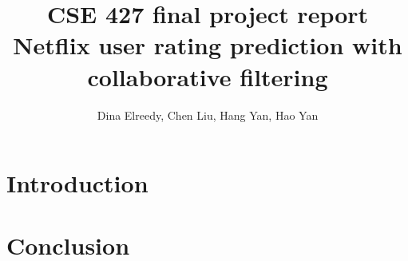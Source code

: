 \documentclass{article}
\title{CSE 427 final project report\\
  Netflix user rating prediction with collaborative filtering}
\author{Dina Elreedy, Chen Liu, Hang Yan, Hao Yan}
\begin{document}
\maketitle
  \section{Introduction}
  
  
  
  
  
  
  \section{Conclusion}
\end{document}
